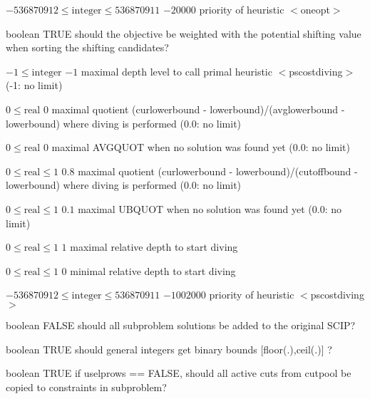 %
{$-536870912\leq\textrm{integer}\leq536870911$}%
{$-20000$}%
{priority of heuristic $<$oneopt$>$}%
{}

%
{boolean}%
{TRUE}%
{should the objective be weighted with the potential shifting value when sorting the shifting candidates?}%
{}

%
{$-1\leq\textrm{integer}$}%
{$-1$}%
{maximal depth level to call primal heuristic $<$pscostdiving$>$ (-1: no limit)}%
{}

%
{$0\leq\textrm{real}$}%
{$0$}%
{maximal quotient (curlowerbound - lowerbound)/(avglowerbound - lowerbound) where diving is performed (0.0: no limit)}%
{}

%
{$0\leq\textrm{real}$}%
{$0$}%
{maximal AVGQUOT when no solution was found yet (0.0: no limit)}%
{}

%
{$0\leq\textrm{real}\leq1$}%
{$0.8$}%
{maximal quotient (curlowerbound - lowerbound)/(cutoffbound - lowerbound) where diving is performed (0.0: no limit)}%
{}

%
{$0\leq\textrm{real}\leq1$}%
{$0.1$}%
{maximal UBQUOT when no solution was found yet (0.0: no limit)}%
{}

%
{$0\leq\textrm{real}\leq1$}%
{$1$}%
{maximal relative depth to start diving}%
{}

%
{$0\leq\textrm{real}\leq1$}%
{$0$}%
{minimal relative depth to start diving}%
{}

%
{$-536870912\leq\textrm{integer}\leq536870911$}%
{$-1002000$}%
{priority of heuristic $<$pscostdiving$>$}%
{}

%
{boolean}%
{FALSE}%
{should all subproblem solutions be added to the original SCIP?}%
{}

%
{boolean}%
{TRUE}%
{should general integers get binary bounds [floor(.),ceil(.)] ?}%
{}

%
{boolean}%
{TRUE}%
{if uselprows == FALSE, should all active cuts from cutpool be copied to constraints in subproblem?}%
{}

